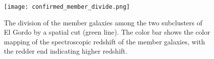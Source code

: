 \begin{figure}
	\texttt{[image: confirmed\_member\_divide.png]}
	\caption{\label{fig:membership} The division of
the member galaxies among the two subclusters of El Gordo by a spatial cut
(green line). The color bar shows the color mapping of the spectroscopic
redshift of the member galaxies, with the redder end indicating higher
redshift.} 
\end{figure}

%
